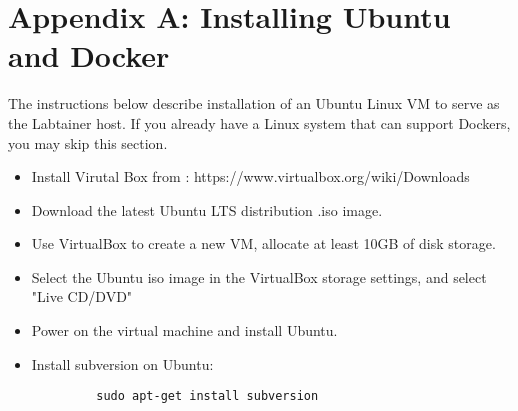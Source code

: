\documentclass{article}
\begin{document}
\newpage
\appendix 
\section {Appendix A: Installing Ubuntu and Docker}
\label{sec:appendixA}
The instructions below describe installation of an Ubuntu Linux VM 
to serve as the Labtainer host.  If you already have a Linux system
that can support Dockers, you may skip this section.
\begin{itemize}
\item Install Virutal Box from : https://www.virtualbox.org/wiki/Downloads
\item Download the latest Ubuntu LTS distribution .iso image.
\item Use VirtualBox to create a new VM, allocate at least 10GB of disk storage.
\item Select the Ubuntu iso image in the VirtualBox storage settings, and select "Live CD/DVD"
\item Power on the virtual machine and install Ubuntu.
\item Install subversion on Ubuntu:
\begin{verbatim}
         sudo apt-get install subversion
\end{verbatim}
\end{itemize}
\end{document}
